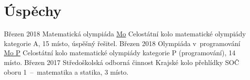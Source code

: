 \documentclass[letterpaper]{twentysecondcv} %
\begin{document}
\section{Úspěchy}
\begin{twenty}
	 \twentyitem
    	{Březen 2018}
        {Matematická olympiáda}
        {\href{http://www.matematickaolympiada.cz}{Mo}}
        {}
        {
        {
       Celostátní kolo matematické olympiády kategorie A, 15 místo, úspěšný řešitel.
        }
    	}
	\twentyitem
    	{Březen 2018}
        {Olympiáda v~programování}
        {\href{http://mo.mff.cuni.cz/p/}{Mo P}}
        {}
        {
        {
       Celostátní kolo matematické olympiády kategorie P (programování), 14 místo.
        }
    	}
	\twentyitem
	{Březen 2017}
        {Středoškolská odborná činnost}
        {}
        {}
        {
        {
       Krajské kolo přehlídky SOČ oboru 1~--~matematika a statika, 3 místo.
        }
    	}
\end{twenty}
\end{document}
